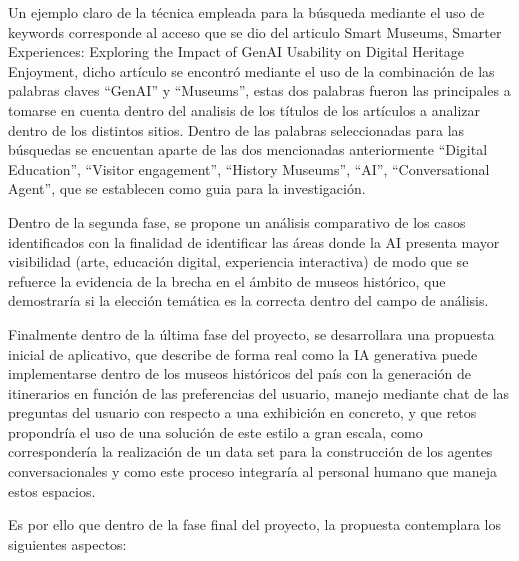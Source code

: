 \documentclass[pdflatex,sn-mathphys-num]{sn-jnl}%
\theoremstyle{thmstyleone}%
\theoremstyle{thmstyletwo}%
\theoremstyle{thmstylethree}%
\begin{document}
Un ejemplo claro de la técnica empleada para la búsqueda mediante el uso de keywords corresponde al acceso que se dio del articulo Smart Museums, Smarter Experiences: Exploring the Impact of GenAI Usability on Digital Heritage Enjoyment, dicho artículo se encontró mediante el uso de la combinación de las palabras claves “GenAI” y “Museums”, estas dos palabras fueron las principales a tomarse en cuenta dentro del analisis de los títulos de los artículos a analizar dentro de los distintos sitios. Dentro de las palabras seleccionadas para las búsquedas se encuentan aparte de las dos mencionadas anteriormente “Digital Education”, “Visitor engagement”, “History Museums”, “AI”, “Conversational Agent”, que se establecen como guia para la investigación.

Dentro de la segunda fase, se propone un análisis comparativo de los casos identificados con la finalidad de identificar las áreas donde la AI presenta mayor visibilidad (arte, educación digital, experiencia interactiva) de modo que se refuerce la evidencia de la brecha en el ámbito de museos histórico, que demostraría si la elección temática es la correcta dentro del campo de análisis.

Finalmente dentro de la última fase del proyecto, se desarrollara una propuesta inicial de aplicativo, que describe de forma real como la IA generativa puede implementarse dentro de los museos históricos del país con la generación de itinerarios en función de las preferencias del usuario, manejo mediante chat de las preguntas del usuario con respecto a una exhibición en concreto, y que retos propondría el uso de una solución de este estilo a gran escala, como correspondería la realización de un data set para la construcción de los agentes conversacionales y como este proceso integraría al personal humano que maneja estos espacios.

Es por ello que dentro de la fase final del proyecto, la propuesta contemplara los siguientes aspectos:
\end{document}
